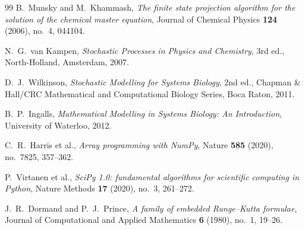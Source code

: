 \documentclass[11pt]{article}
\begin{document}
\begin{thebibliography}{99}
B.~Munsky and M.~Khammash,
\textit{The finite state projection algorithm for the solution of the chemical
master equation},
Journal of Chemical Physics \textbf{124} (2006), no.~4, 044104.

N.~G.~van Kampen,
\textit{Stochastic Processes in Physics and Chemistry},
3rd ed., North-Holland, Amsterdam, 2007.

D.~J.~Wilkinson,
\textit{Stochastic Modelling for Systems Biology},
2nd ed., Chapman \& Hall/CRC Mathematical and Computational Biology Series, Boca Raton, 2011.

B.~P.~Ingalls,
\textit{Mathematical Modelling in Systems Biology: An Introduction},
University of Waterloo, 2012.

C.~R.~Harris et al.,
\textit{Array programming with NumPy},
Nature \textbf{585} (2020), no.~7825, 357--362.

P.~Virtanen et al.,
\textit{SciPy 1.0: fundamental algorithms for scientific computing in Python},
Nature Methods \textbf{17} (2020), no.~3, 261--272.

J.~R.~Dormand and P.~J.~Prince,
\textit{A family of embedded Runge--Kutta formulae},
Journal of Computational and Applied Mathematics \textbf{6} (1980), no.~1, 19--26.

\end{thebibliography}
\end{document}

